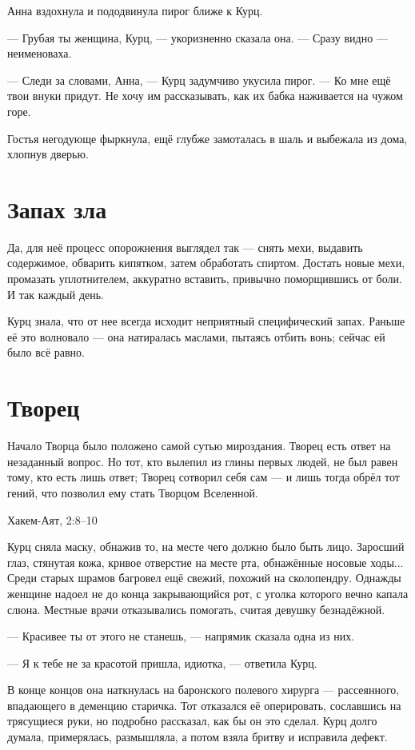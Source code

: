 Анна вздохнула и пододвинула пирог ближе к Курц.

--- Грубая ты женщина, Курц, --- укоризненно сказала она.
--- Сразу видно --- неименоваха.

--- Следи за словами, Анна, --- Курц задумчиво укусила пирог.
--- Ко мне ещё твои внуки придут.
Не хочу им рассказывать, как их бабка наживается на чужом горе.

Гостья негодующе фыркнула, ещё глубже замоталась в шаль и выбежала из дома, хлопнув дверью.

\section{Запах зла}

Да, для неё процесс опорожнения выглядел так --- снять мехи, выдавить содержимое, обварить кипятком, затем обработать спиртом.
Достать новые мехи, промазать уплотнителем, аккуратно вставить, привычно поморщившись от боли.
И так каждый день.

Курц знала, что от нее всегда исходит неприятный специфический запах.
Раньше её это волновало --- она натиралась маслами, пытаясь отбить вонь;
сейчас ей было всё равно.

\section{Творец}

\epigraph{Начало Творца было положено самой сутью мироздания.
Творец есть ответ на незаданный вопрос.
Но тот, кто вылепил из глины первых людей, не был равен тому, кто есть лишь ответ;
Творец сотворил себя сам --- и лишь тогда обрёл тот гений, что позволил ему стать Творцом Вселенной.}
{Хакем-Аят, 2:8--10}

Курц сняла маску, обнажив то, на месте чего должно было быть лицо.
Заросший глаз, стянутая кожа, кривое отверстие на месте рта, обнажённые носовые ходы...
Среди старых шрамов багровел ещё свежий, похожий на сколопендру.
Однажды женщине надоел не до конца закрывающийся рот, с уголка которого вечно капала слюна.
Местные врачи отказывались помогать, считая девушку безнадёжной.

--- Красивее ты от этого не станешь, --- напрямик сказала одна из них.

--- Я к тебе не за красотой пришла, идиотка, --- ответила Курц.

В конце концов она наткнулась на баронского полевого хирурга --- рассеянного, впадающего в деменцию старичка.
Тот отказался её оперировать, сославшись на трясущиеся руки, но подробно рассказал, как бы он это сделал.
Курц долго думала, примерялась, размышляла, а потом взяла бритву и исправила дефект.

